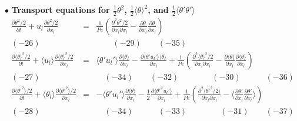 \documentclass[a4paper,11pt]{article}
\begin{document}
\noindent $\bullet$  \textbf{Transport equations for $\frac{1}{2} \theta^2$, $\frac{1}{2}\langle \theta\rangle^2 $, and $\frac{1}{2}\langle \theta'\theta'\rangle$}
\begin{eqnarray}
\frac{\partial \theta^2/2 }{\partial t}
+u_l\frac{\partial \theta^2/2 }{\partial x_l}
&=&\frac{1}{Pe}(\frac{\partial^2 \theta^2/2 }{\partial x_l\partial x_l}-\frac{\partial \theta }{\partial x_l}\frac{\partial \theta }{\partial x_l}) \\
(-26)   &&\qquad{} (-29) \quad{} \quad{} (-35) \nonumber \\
\frac{\partial \langle \theta\rangle^2/2 }{\partial t}
+\langle u_l\rangle \frac{\partial \langle \theta\rangle^2 /2 }{\partial x_l}
&=&\langle \theta'u_l'\rangle \frac{\partial \langle \theta \rangle}{\partial x_l}
-\frac{\partial \langle \theta'u_l'\rangle \langle \theta \rangle }{\partial x_l} 
+\frac{1}{Pe}(\frac{\partial^2 \langle \theta\rangle^2 /2}{\partial x_l\partial x_l}-\frac{\partial \langle \theta\rangle }{\partial x_l} \frac{\partial \langle \theta\rangle }{\partial x_l}) \\
(-27) \quad{}   &&\quad{} (-34) \quad{} \quad{} (-32)\qquad{}\qquad{} (-30) \quad{} \qquad{} (-36) \nonumber \\
\frac{\partial \langle \theta'^2\rangle/2 }{\partial t}
+\langle \theta_l\rangle \frac{\partial \langle \theta'^2\rangle/2 }{\partial x_l}
&=&-\langle \theta'u_l'\rangle \frac{\partial \langle \theta \rangle  }{\partial x_l}
-\frac{1}{2}\frac{\partial \langle \theta'^2u_l'\rangle}{\partial x_l} 
+\frac{1}{Pe}(\frac{\partial^2 \langle \theta'^2 /2\rangle}{\partial x_l\partial x_l}-\langle \frac{\partial  \theta' }{\partial x_l}\frac{\partial  \theta' }{\partial x_l}\rangle) \\
(-28) \quad{}   &&\quad{} (-34) \qquad{} \quad{} (-33)\qquad{}\qquad{} (-31) \quad{} \quad{} (-37) \nonumber 
\end{eqnarray}
\end{document}
